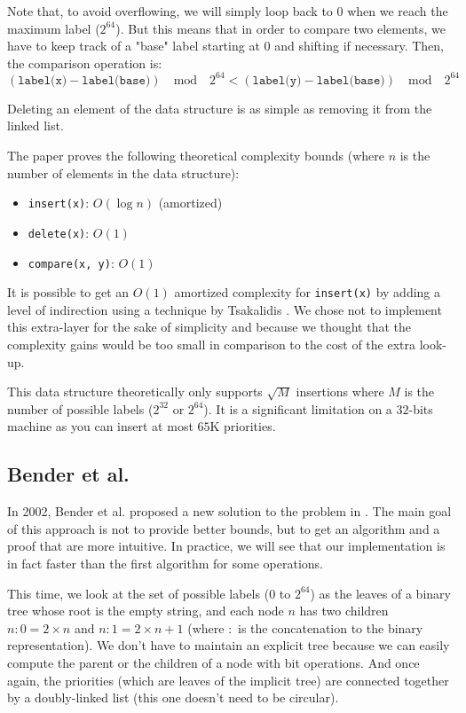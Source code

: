 \documentclass[12pt]{article}
\begin{document}
Note that, to avoid overflowing, we will simply loop back to 0 when we reach the maximum label ($2^{64}$).
But this means that in order to compare two elements, we have to keep track of a "base" label starting at 0 and shifting if necessary.
Then, the comparison operation is:
$$ (\texttt{label(x)} - \texttt{label(base)}) \quad \text{mod} \quad 2^{64} < (\texttt{label(y)} - \texttt{label(base)}) \quad \text{mod} \quad 2^{64} $$

Deleting an element of the data structure is as simple as removing it from the linked list.

The paper proves the following theoretical complexity bounds (where $n$ is the number of elements in the data structure):
\begin{itemize}
    \item \texttt{insert(x)}: $O(\log n)$ (amortized)
    \item \texttt{delete(x)}: $O(1)$
    \item \texttt{compare(x, y)}: $O(1)$
\end{itemize}

It is possible to get an $O(1)$ amortized complexity for \texttt{insert(x)} by adding a level of indirection using a technique by Tsakalidis \cite{10.1007/BFb0036494}. We chose not to implement this extra-layer for the sake of simplicity and because we thought that the complexity gains would be too small in comparison to the cost of the extra look-up.

This data structure theoretically only supports $\sqrt{M}$ insertions where $M$ is the number of possible labels ($2^{32}$ or $2^{64}$). It is a significant limitation on a $32$-bits machine as you can insert at most $65$K priorities.

\subsection{Bender et al.}

In 2002, Bender et al. proposed a new solution to the problem in \cite{10.5555/647912.740822}. The main goal of this approach is not to provide better bounds, but to get an algorithm and a proof that are more intuitive. In practice, we will see that our implementation is in fact faster than the first algorithm for some operations.

This time, we look at the set of possible labels ($0$ to $2^{64}$) as the leaves of a binary tree whose root is the empty string, and each node $n$ has two children $n:0 = 2 \times n$ and $n:1 = 2 \times n + 1$ (where $:$ is the concatenation to the binary representation).
We don't have to maintain an explicit tree because we can easily compute the parent or the children of a node with bit operations.
And once again, the priorities (which are leaves of the implicit tree) are connected together by a doubly-linked list (this one doesn't need to be circular).
\end{document}
